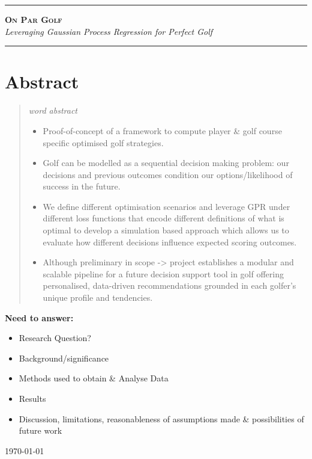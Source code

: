 \documentclass[11pt, letterpaper]{article}
\begin{document}
\begin{titlepage}
    \centering
    \vspace*{2.5cm}
    
    \rule{\textwidth}{1.5pt}\vspace{0.5cm}
    
    {\huge \bfseries \scshape On Par Golf} \\
    \vspace{0.3cm}
    {\Large \itshape Leveraging Gaussian Process Regression for Perfect Golf} %
    
    \vspace{0.5cm}
    \rule{\textwidth}{1.5pt}
    
    \vspace{3cm}
    
    \section*{Abstract}
    \begin{quote}
    \centering
    \itshape %
     word abstract\\
    \begin{itemize}
        \item Proof-of-concept of a framework to compute player \& golf course specific optimised golf strategies.
        \item Golf can be modelled as a sequential decision making problem: our decisions and previous outcomes condition our options/likelihood of success in the future.
        \item We define different optimisation scenarios and leverage GPR under different loss functions that encode different definitions of what is optimal to develop a simulation based approach which allows us to evaluate how different decisions influence expected scoring outcomes.
        \item Although preliminary in scope -> project establishes a modular and scalable pipeline for a future decision support tool in golf offering personalised, data-driven recommendations grounded in each golfer's unique profile and tendencies.
    \end{itemize}
    \end{quote}
    \textbf{Need to answer:}
    \begin{itemize}
        \item Research Question?
        \item Background/significance
        \item Methods used to obtain \& Analyse Data
        \item Results
        \item Discussion, limitations, reasonableness of assumptions made \& possibilities of future work
        \end{itemize}

    
    \vfill
    \today
\end{titlepage}
\end{document}
